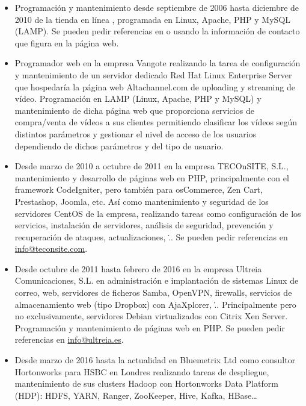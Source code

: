 \documentclass[spanish]{simplecv}
\begin{document}
\begin{itemize}
\item Programación y mantenimiento desde septiembre de 2006 hasta diciembre de 2010 de la tienda en línea
\textcolor{blue}{},
programada en Linux, Apache, PHP y MySQL (LAMP).\newline
Se pueden pedir referencias
en \textcolor{blue}{}
o usando la información de contacto que figura en la página web.
\item Programador web en la empresa Vangote realizando la tarea de configuración y mantenimiento
de un servidor dedicado Red Hat Linux Enterprise Server que hospedaría la página web
Altachannel.com de uploading y streaming de vídeo. Programación en LAMP (Linux, Apache,
PHP y MySQL) y mantenimiento de dicha página web que proporciona servicios de compra/venta
de vídeos a sus clientes permitiendo clasificar los vídeos según distintos parámetros y gestionar el
nivel de acceso de los usuarios dependiendo de dichos parámetros y del tipo de usuario.
\item Desde marzo de 2010 a octubre de 2011 en la empresa TECOnSITE, S.L., mantenimiento
y desarrollo de páginas web en PHP, principalmente con el framework CodeIgniter, pero
también para osCommerce, Zen Cart, Prestashop, Joomla, etc. Así como mantenimiento y
seguridad de los servidores CentOS de la empresa, realizando tareas como configuración de los
servicios, instalación de servidores, análisis de seguridad, prevención y recuperación de ataques,
actualizaciones, \...\newline
Se pueden pedir referencias en \href{mailto:info@teconsite.com}{info@teconsite.com}.
\item Desde octubre de 2011 hasta febrero de 2016 en la empresa Ultreia Comunicaciones, S.L. en
administración e implantación de sistemas Linux de correo, web, servidores de ficheros Samba, OpenVPN,
firewalls, servicios de almacenamiento web (tipo Dropbox) con AjaXplorer, \...
Principalmente pero no exclusivamente, servidores Debian virtualizados con Citrix
Xen Server. Programación y mantenimiento de páginas web en PHP.\newline
Se pueden pedir referencias en \href{mailto:info@ultreia.es}{info@ultreia.es}.
\item Desde marzo de 2016 hasta la actualidad en Bluemetrix Ltd como consultor Hortonworks para HSBC en Londres realizando tareas de despliegue, mantenimiento de sus clusters Hadoop con Hortonworks Data Platform (HDP): HDFS, YARN, Ranger, ZooKeeper, Hive, Kafka, HBase…
\end{itemize}
\end{document}
